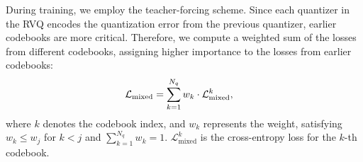 During training, we employ the teacher-forcing scheme. 
Since each quantizer in the RVQ encodes the quantization error from the previous quantizer, earlier codebooks are more critical. Therefore, we compute a weighted sum of the losses from different codebooks, assigning higher importance to the losses from earlier codebooks:
\vspace{-3pt}
\begin{equation}
\begin{aligned} 
\label{eq:mix_loss}
\mathcal{L}_{\text{mixed}} &= \sum_{k=1}^{N_q} w_k \cdot \mathcal{L}^k_{\text{mixed}}, 
\end{aligned} 
\vspace{-3pt}
\end{equation}
where $k$ denotes the codebook index, and $w_k$ represents the weight, satisfying $w_k \leq w_j$ for $ k < j $ and $ \sum_{k=1}^{N_q} w_k=1$. $\mathcal{L}^k_{\text{mixed}}$ is the cross-entropy loss for the $k$-th codebook.

